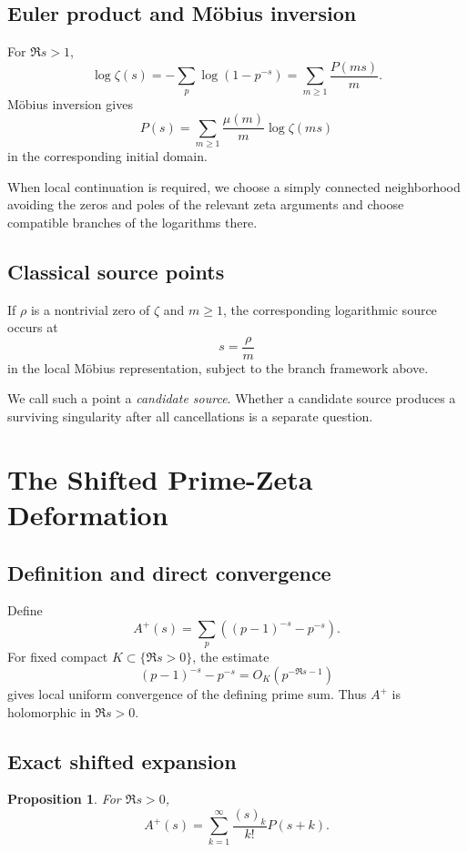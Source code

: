 \documentclass[11pt]{article}
\newtheorem{proposition}[theorem]{Proposition}
\theoremstyle{definition}
\begin{document}
\subsection{Euler product and Möbius inversion}

For $\Re s>1$,
\[
\log\zeta(s)
=
-\sum_p\log(1-p^{-s})
=
\sum_{m\ge1}\frac{P(ms)}m.
\]
Möbius inversion gives
\[
P(s)=\sum_{m\ge1}\frac{\mu(m)}m\log\zeta(ms)
\]
in the corresponding initial domain.

When local continuation is required, we choose a simply connected neighborhood avoiding the zeros and poles of the relevant zeta arguments and choose compatible branches of the logarithms there.

\subsection{Classical source points}

If $\rho$ is a nontrivial zero of $\zeta$ and $m\ge1$, the corresponding logarithmic source occurs at
\[
s=\frac{\rho}{m}
\]
in the local Möbius representation, subject to the branch framework above.

We call such a point a \emph{candidate source}. Whether a candidate source produces a surviving singularity after all cancellations is a separate question.

\section{The Shifted Prime-Zeta Deformation}

\subsection{Definition and direct convergence}

Define
\[
A^+(s)=\sum_p\left((p-1)^{-s}-p^{-s}\right).
\]
For fixed compact $K\subset\{\Re s>0\}$, the estimate
\[
(p-1)^{-s}-p^{-s}=O_K(p^{-\Re s-1})
\]
gives local uniform convergence of the defining prime sum. Thus $A^+$ is holomorphic in $\Re s>0$.

\subsection{Exact shifted expansion}

\begin{proposition}
\label{prop:shifted}
For $\Re s>0$,
\[
\boxed{
A^+(s)=
\sum_{k=1}^{\infty}\frac{(s)_k}{k!}P(s+k).
}
\]
\end{proposition}
\end{document}
